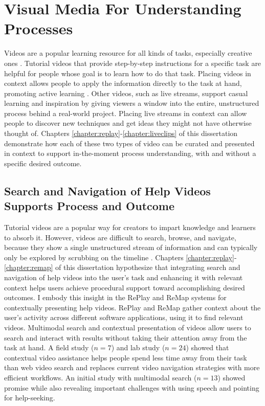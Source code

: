 \section{Visual Media For Understanding Processes}
Videos are a popular learning resource for all kinds of tasks, especially creative ones \cite{Chi2012, Nguyen2015, Pongnumkul2011}. Tutorial videos that provide step-by-step instructions for a specific task are helpful for people whose goal is to learn how to do that task. Placing videos in context allows people to apply the information directly to the task at hand, promoting active learning \cite{Bonwell1991}. Other videos, such as live streams, support casual learning and inspiration by giving viewers a window into the entire, unstructured process behind a real-world project. Placing live streams in context can allow people to discover new techniques and get ideas they might not have otherwise thought of. Chapters \ref{chapter:replay}-\ref{chapter:liveclips} of this dissertation demonstrate how each of these two types of video can be curated and presented in context to support in-the-moment process understanding, with and without a specific desired outcome.

\subsection{Search and Navigation of Help Videos Supports Process and Outcome}
Tutorial videos are a popular way for creators to impart knowledge and learners to absorb it. However, videos are difficult to search, browse, and navigate, because they show a single unstructured stream of information and can typically only be explored by scrubbing on the timeline \cite{Kim2014, Pavel2015, Pavel2014}. Chapters \ref{chapter:replay}-\ref{chapter:remap} of this dissertation hypothesize that integrating search and navigation of help videos into the user's task and enhancing it with relevant context helps users achieve procedural support toward accomplishing desired outcomes. I embody this insight in the RePlay and ReMap systems for contextually presenting help videos. RePlay and ReMap gather context about the user's activity across different software applications, using it to find relevant videos. Multimodal search and contextual presentation of videos allow users to search and interact with results without taking their attention away from the task at hand. A field study ($n=7$) and lab study ($n=24$) showed that contextual video assistance helps people spend less time away from their task than web video search and replaces current video navigation strategies with more efficient workflows. An initial study with multimodal search ($n=13$) showed promise while also revealing important challenges with using speech and pointing for help-seeking.

